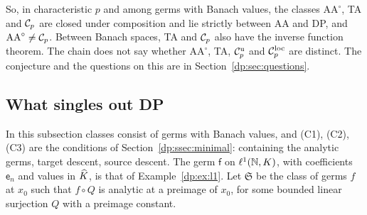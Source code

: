 So, in characteristic $p$ and among germs with Banach values, the classes $\mathrm{AA}^\circ$, TA and $\mathcal{C}_p$ are closed under composition and lie strictly between AA and DP, and $\mathrm{AA}^\circ\ne\mathcal{C}_p$. Between Banach spaces, TA and $\mathcal{C}_p$ also have the inverse function theorem. The chain does not say whether $\mathrm{AA}^\circ$, TA, $\mathcal{C}_p^{\rm u}$ and $\mathcal{C}_p^{\rm loc}$ are distinct. The conjecture and the questions on this are in Section~\ref{dp:sec:questions}.

\subsection{What singles out DP}\label{dp:ssec:singles}

In this subsection classes consist of germs with Banach values, and (C1), (C2), (C3) are the conditions of Section~\ref{dp:ssec:minimal}: containing the analytic germs, target descent, source descent. The germ $\mathsf f$ on $\ell^1(\mathbb N,K)$, with coefficients $\mathsf e_n$ and values in $\widehat K$, is that of Example~\ref{dp:ex:l1}. Let $\mathfrak S$ be the class of germs $f$ at $x_0$ such that $f\circ Q$ is analytic at a preimage of $x_0$, for some bounded linear surjection $Q$ with a preimage constant.

